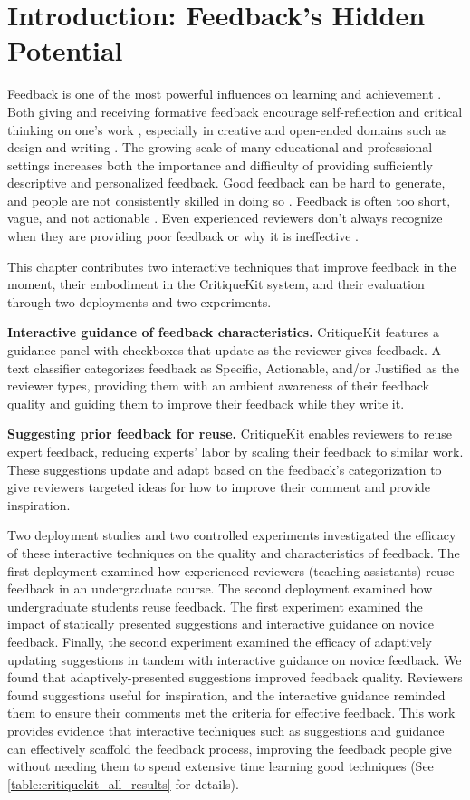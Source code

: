 \section{Introduction: Feedback's Hidden Potential}
Feedback is one of the most powerful influences on learning and achievement \cite{Hattie2007}. Both giving and receiving formative feedback encourage self-reflection and critical thinking on one's work \cite{Li2010, Nicol2006}, especially in creative and open-ended domains such as design and writing \cite{Hattie2007, Sadler1989}. The growing scale of many educational and professional settings increases both the importance and difficulty of providing sufficiently descriptive and personalized feedback. Good feedback can be hard to generate, and people are not consistently skilled in doing so \cite{Kulkarni2013, Yuan2016}. Feedback is often too short, vague, and not actionable \cite{Kulkarni2015, Sommers1982, Xiong2012}. Even experienced reviewers don't always recognize when they are providing poor feedback or why it is ineffective \cite{Sommers1982}.

This chapter contributes two interactive techniques that improve feedback in the moment, their embodiment in the CritiqueKit system, and their evaluation through two deployments and two experiments.

\textbf{Interactive guidance of feedback characteristics.} CritiqueKit features a guidance panel with checkboxes that update as the reviewer gives feedback. A text classifier categorizes feedback as Specific, Actionable, and/or Justified as the reviewer types, providing them with an ambient awareness of their feedback quality and guiding them to improve their feedback while they write it.

\textbf{Suggesting prior feedback for reuse.} CritiqueKit enables reviewers to reuse expert feedback, reducing experts' labor by scaling their feedback to similar work. These suggestions update and adapt based on the feedback's categorization to give reviewers targeted ideas for how to improve their comment and provide inspiration. 

Two deployment studies and two controlled experiments investigated the efficacy of these interactive techniques on the quality and characteristics of feedback. The first deployment examined how experienced reviewers (teaching assistants) reuse feedback in an undergraduate course. The second deployment examined how undergraduate students reuse feedback. The first experiment examined the impact of statically presented suggestions and interactive guidance on novice feedback. Finally, the second experiment examined the efficacy of adaptively updating suggestions in tandem with interactive guidance on novice feedback. We found that adaptively-presented suggestions improved feedback quality. Reviewers found suggestions useful for inspiration, and the interactive guidance reminded them to ensure their comments met the criteria for effective feedback. This work provides evidence that interactive techniques such as suggestions and guidance can effectively scaffold the feedback process, improving the feedback people give without needing them to spend extensive time learning good techniques (See \autoref{table:critiquekit_all_results} for details).

